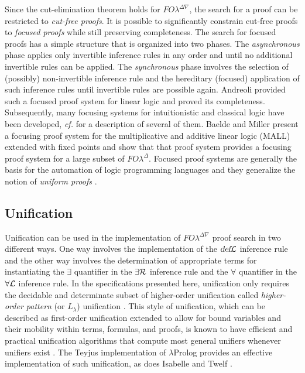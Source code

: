 \documentclass{acmtrans2m}
\newcommand{\FOL   }{FO\lambda}
\newcommand{\FOLD  }{\FOL^{\Delta}}
\newcommand{\FOLDNb}{\FOL^{\Delta\nabla}}
\newcommand{\defL}{\hbox{\sl def}{\cal L}}
\newcommand{\existsR}{\exists{\cal R}}
\newcommand{\forallL}{\forall{\cal L}}
\begin{document}
Since the cut-elimination theorem holds for $\FOLDNb$, the search for
a proof can be restricted to {\em cut-free proofs}.  It is possible to
significantly constrain cut-free proofs to {\em focused proofs} while
still preserving completeness.  The search for focused proofs has a
simple structure that is organized into two phases.  The {\em
  asynchronous} phase applies only invertible inference rules in any
order and until no additional invertible rules can be applied.  The
{\em synchronous} phase involves the selection of (possibly)
non-invertible inference rule and the hereditary (focused) application
of such inference rules until invertible rules are possible again.
Andreoli \cite{andreoli92jlc} provided such a focused proof system for
linear logic and proved its completeness.  Subsequently, many 
focusing systems for intuitionistic and classical logic have been
developed, {\em cf.} \cite{liang07csl} for a description of several of
them. 
Baelde and Miller \citeyear{baelde07lpar} present a 
focusing proof system for the multiplicative and additive linear
logic (MALL) extended with fixed points and show that that proof
system provides a focusing proof system for a large
subset of $\FOLD$.
Focused proof systems are
generally the basis for the automation of logic programming languages
and they generalize the notion of {\em uniform proofs}
\cite{miller91apal}.  

\subsection{Unification}
Unification can be used in the implementation of $\FOLDNb$ proof
search in two different ways.  
One way involves the implementation of the $\defL$ inference rule
and the other way involves the determination of appropriate terms for
instantiating the 
$\exists$ quantifier in the $\existsR$ inference rule and the
$\forall$ quantifier in the $\forallL$ inference rule.  In the
specifications presented here, unification only requires the decidable
and determinate subset of higher-order unification called {\em
higher-order pattern} (or $L_\lambda$) unification \cite{miller91jlc}.
This style of unification, which can be described as first-order
unification extended to allow for bound variables and their mobility
within terms, formulas, and proofs, is known to have efficient and practical
unification algorithms that compute most general unifiers whenever
unifiers exist \cite{nipkow93lics,nadathur05iclp}.  The Teyjus implementation
\cite{nadathur99cade,nadathur05tplp} of $\lambda$Prolog provides an
effective implementation of such unification, as does Isabelle
\cite{paulson90abs} and Twelf \cite{pfenning99cade}.
\end{document}
